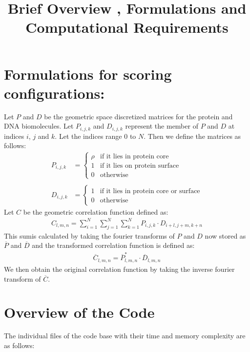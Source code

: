 \documentclass{article}
\title{ Brief Overview , Formulations and Computational Requirements}
\begin{document}
\maketitle
{}

\newpage
{}

\section{Formulations for scoring configurations:}

Let $P$ and $D$ be the geometric space discretized matrices for the protein and DNA biomolecules. Let $P_{i,j,k}$ and $D_{i,j,k}$ represent the member of $P$ and $D$ at indices $i$, $j$ and $k$. Let the indices range $0$ to $N$. Then we define the matrices as follows:\linebreak
\begin{align*}
 P_{i,j,k} &= \begin{cases} \rho & \text{if it lies in protein core} \\ 1 &\text{if it lies on protein surface} \\ 0 & \text{otherwise} \end{cases} \\ \\
 D_{i,j,k} &= \begin{cases} 1 & \text{if it lies in protein core or surface} \\ 0 & \text{otherwise} \end{cases}  
\end{align*}\linebreak
Let $C$ be the geometric correlation function defined as:
\begin{align*}
C_{l,m,n} = \sum_{i=1}^N \sum_{j=1}^N \sum_{k=1}^N P_{i,j,k} \cdot D_{i+l,j+m,k+n}
\end{align*}\linebreak
This sumis calculated by taking the fourier transforms of $P$ and $D$ now stored as $\overline{P}$ and $\overline{D}$ and the transformed correlation function is defined as:
\begin{align*}
\overline{C}_{l,m,n} = \overline{P}_{l,m,n}^* \cdot \overline{D}_{l,m,n} 
\end{align*}\linebreak
We then obtain the original correlation function by taking the inverse fourier transform of $\overline{C}$.

\newpage
\section{Overview of the Code}
The individual files of the code base with their time and memory complexity are as follows:
\end{document}
